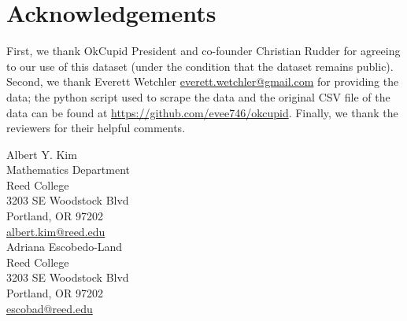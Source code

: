 \documentclass{article}\usepackage[]{graphicx}\usepackage[]{color}
\begin{document}
%
\section{Acknowledgements}\label{ack}
%
First, we thank OkCupid President and co-founder Christian Rudder for agreeing to our use of this dataset (under the condition that the dataset remains public).  Second, we thank Everett Wetchler \href{mailto:everett.wetchler@gmail.com}{everett.wetchler@gmail.com} for providing the data; the python script used to scrape the data and the original CSV file of the data can be found at \href{https://github.com/evee746/okcupid}{https://github.com/evee746/okcupid}.  Finally, we thank the reviewers for their helpful comments.

\noindent\makebox[\linewidth]{\rule{\textwidth}{0.4pt}}

\noindent Albert Y. Kim\\
Mathematics Department\\
Reed College\\
3203 SE Woodstock Blvd\\
Portland, OR 97202\\
\href{mailto:albert.kim@reed.edu}{albert.kim@reed.edu}\\

\noindent Adriana Escobedo-Land\\
Reed College\\
3203 SE Woodstock Blvd\\
Portland, OR 97202\\
\href{mailto:escobad@reed.edu}{escobad@reed.edu}










%
%


\end{document}
